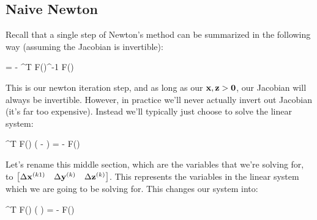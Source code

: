 
\subsection{Naive Newton}

Recall that a single step of Newton's method can be summarized
in the following way (assuming the Jacobian is invertible):

\begin{frml}
	 =
	 - 
	\nabla^T F\bigg(\bigg)^{-1}
	F\bigg(\bigg)
\end{frml}

This is our newton iteration step, and 
as long as our $\mathbf{x}, \mathbf{z} > \mathbf{0}$, our Jacobian will always be invertible. 
However, in practice we'll never actually invert out Jacobian 
(it's far too expensive). Instead we'll typically just choose to solve the linear 
system:

\begin{frml}
	\nabla^T F\bigg(\bigg)
	\bigg(
	 -
	\bigg)
	= - 
	F\bigg(\bigg)
\end{frml}

Let's rename this middle section, which are the variables that we're solving for,
to $ \begin{bmatrix} \Delta \mathbf{x}^{(k1)} & \Delta \mathbf{y}^{(k)} & \Delta \mathbf{z}^{(k)} \end{bmatrix}$. This 
represents the variables in the linear system which we are going to be solving 
for. This changes our system into:

\begin{frml}
	\nabla^T F\bigg(\bigg)
	\bigg(
	\bigg)
	= - 
	F\bigg(\bigg)
\end{frml}

